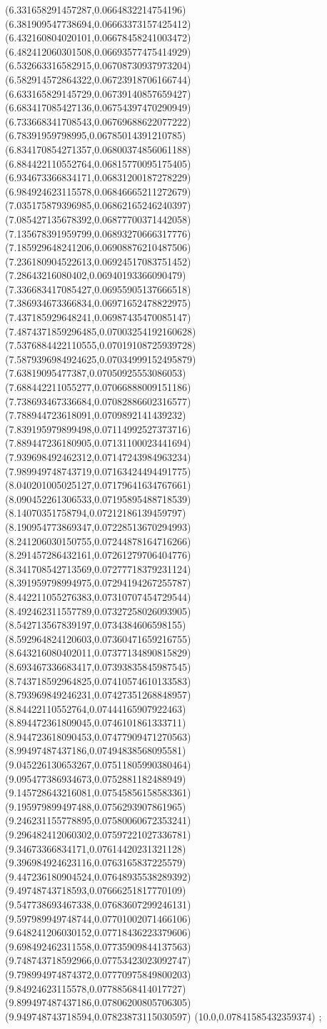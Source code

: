 {(6.331658291457287,0.0664832214754196)
(6.381909547738694,0.06663373157425412)
(6.432160804020101,0.06678458241003472)
(6.482412060301508,0.06693577475414929)
(6.532663316582915,0.06708730937973204)
(6.582914572864322,0.06723918706166744)
(6.633165829145729,0.06739140857659427)
(6.683417085427136,0.06754397470290949)
(6.733668341708543,0.06769688622077222)
(6.78391959798995,0.06785014391210785)
(6.834170854271357,0.06800374856061188)
(6.884422110552764,0.06815770095175405)
(6.934673366834171,0.06831200187278229)
(6.984924623115578,0.06846665211272679)
(7.035175879396985,0.06862165246240397)
(7.085427135678392,0.06877700371442058)
(7.135678391959799,0.06893270666317776)
(7.185929648241206,0.06908876210487506)
(7.236180904522613,0.06924517083751452)
(7.28643216080402,0.06940193366090479)
(7.336683417085427,0.06955905137666518)
(7.386934673366834,0.06971652478822975)
(7.437185929648241,0.06987435470085147)
(7.4874371859296485,0.07003254192160628)
(7.5376884422110555,0.07019108725939728)
(7.5879396984924625,0.07034999152495879)
(7.63819095477387,0.07050925553086053)
(7.688442211055277,0.07066888009151186)
(7.738693467336684,0.07082886602316577)
(7.788944723618091,0.0709892141439232)
(7.839195979899498,0.07114992527373716)
(7.889447236180905,0.07131100023441694)
(7.939698492462312,0.07147243984963234)
(7.989949748743719,0.07163424494491775)
(8.040201005025127,0.07179641634767661)
(8.090452261306533,0.07195895488718539)
(8.14070351758794,0.07212186139459797)
(8.190954773869347,0.07228513670294993)
(8.241206030150755,0.07244878164716266)
(8.291457286432161,0.07261279706404776)
(8.341708542713569,0.07277718379231124)
(8.391959798994975,0.07294194267255787)
(8.442211055276383,0.07310707454729544)
(8.492462311557789,0.07327258026093905)
(8.542713567839197,0.0734384606598155)
(8.592964824120603,0.07360471659216755)
(8.643216080402011,0.07377134890815829)
(8.693467336683417,0.07393835845987545)
(8.743718592964825,0.07410574610133583)
(8.793969849246231,0.07427351268848957)
(8.84422110552764,0.07444165907922463)
(8.894472361809045,0.0746101861333711)
(8.944723618090453,0.07477909471270563)
(8.99497487437186,0.07494838568095581)
(9.045226130653267,0.07511805990380464)
(9.095477386934673,0.0752881182488949)
(9.145728643216081,0.07545856158583361)
(9.195979899497488,0.0756293907861965)
(9.246231155778895,0.07580060672353241)
(9.296482412060302,0.07597221027336781)
(9.34673366834171,0.07614420231321128)
(9.396984924623116,0.0763165837225579)
(9.447236180904524,0.07648935538289392)
(9.49748743718593,0.07666251817770109)
(9.547738693467338,0.07683607299246131)
(9.597989949748744,0.07701002071466106)
(9.648241206030152,0.07718436223379606)
(9.698492462311558,0.07735909844137563)
(9.748743718592966,0.07753423023092747)
(9.798994974874372,0.07770975849800203)
(9.84924623115578,0.07788568414017727)
(9.899497487437186,0.07806200805706305)
(9.949748743718594,0.07823873115030597)
(10.0,0.07841585432359374)
};
